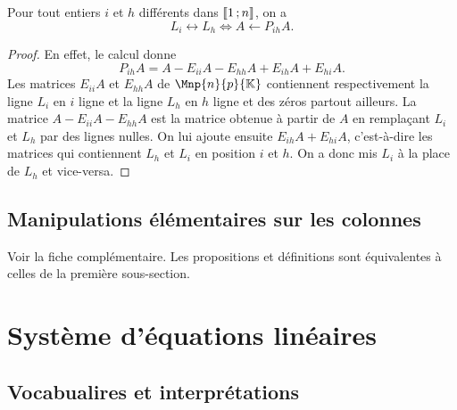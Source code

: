 %
\begin{prop}
  Pour tout entiers $i$ et $h$ différents dans $\mathopen{\llbracket}1\mathclose{}\mathpunct{};n\mathclose{\rrbracket}$, on a
  \begin{equation}
    L_i \leftrightarrow L_h \iff A \leftarrow P_{ih}A.
  \end{equation}
\end{prop}
\begin{proof}
  En effet, le calcul donne
  \begin{equation}
    P_{ih}A = A - E_{ii}A-E_{hh}A+E_{ih}A+E_{hi}A.
  \end{equation}
  Les matrices $E_{ii}A$ et $E_{hh}A$ de $\Mnp{n}{p}{\K}$ contiennent respectivement la ligne $L_i$ en $i$\ieme{} ligne et la ligne $L_h$ en $h$\ieme{} ligne et des zéros partout ailleurs. La matrice $A - E_{ii}A-E_{hh}A$ est la matrice obtenue à partir de $A$ en remplaçant $L_i$ et $L_h$ par des lignes nulles. On lui ajoute ensuite $E_{ih}A+E_{hi}A$, c'est-à-dire les matrices qui contiennent $L_h$ et $L_i$ en position $i$ et $h$. On  a donc mis $L_i$ à la place de $L_h$ et vice-versa.
\end{proof}
%
\subsection{Manipulations élémentaires sur les colonnes}
Voir la fiche complémentaire. Les propositions et définitions sont équivalentes à celles de la première sous-section.
%
\section{Système d'équations linéaires}
\subsection{Vocabualires et interprétations}
